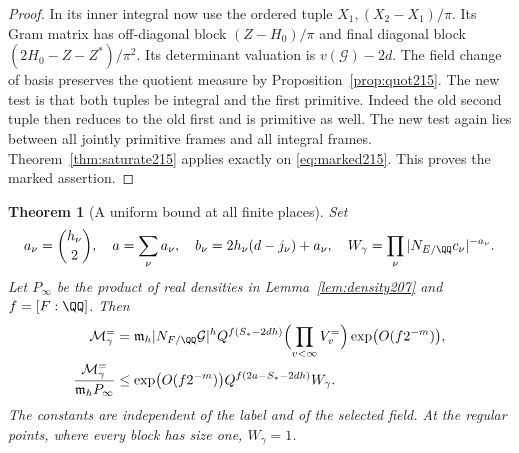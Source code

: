\documentclass[a4paper,11pt]{article}
\newtheorem{theorem}[proposition]{Theorem}
\theoremstyle{definition}
\theoremstyle{remark}
\numberwithin{equation}{section}
\begin{document}
\begin{proof}
In its inner integral now use the ordered tuple
\(X_1,(X_2-X_1)/\pi\). Its Gram matrix has off-diagonal
block \((Z-H_0)/\pi\) and final diagonal block
\((2H_0-Z-Z^*)/\pi^2\). Its determinant valuation is
\(v(\mathcal G)-2d\). The field change of basis preserves the
quotient measure by Proposition~\ref{prop:quot215}. The new
test is that both tuples be integral and the first primitive.
Indeed the old second tuple then reduces to the old first and
is primitive as well. The new test again lies between all
jointly primitive frames and all integral frames.
Theorem~\ref{thm:saturate215} applies exactly on
\eqref{eq:marked215}. This proves the marked assertion.
\end{proof}

\begin{theorem}[A uniform bound at all finite places]\leavevmode\label{thm:allfinite215}
Set
\[
 a_\nu=\binom{h_\nu}{2},\quad a=\sum_\nu a_\nu,\quad
 b_\nu=2h_\nu(d-j_\nu)+a_\nu,\quad
 W_\gamma=\prod_\nu |N_{E/\QQ}c_\nu|^{-a_\nu}.
\]
Let \(P_\infty\) be the product of real densities in
Lemma~\ref{lem:density207} and \(f=[F:\QQ]\). Then
\begin{align}
 \mathcal M_\gamma^{=}
 &=\mathfrak m_h |N_{F/\QQ}\mathcal G|^h
          Q^{f(S_*-2dh)} \Bigl(\prod_{v<\infty}V_v^{=}\Bigr)
          \exp\bigl(O(f2^{-m})\bigr),                    \label{eq:fprod215}\\
 \frac{\mathcal M_\gamma^{=}}{\mathfrak m_h P_\infty}
 &\le \exp\bigl(O(f2^{-m})\bigr)
            Q^{f(2a-S_*-2dh)} W_\gamma .                \label{eq:fratio215}
\end{align}
The constants are independent of the label and of the selected
field. At the regular points, where every block has size one,
\(W_\gamma=1\).
\end{theorem}
\end{document}
